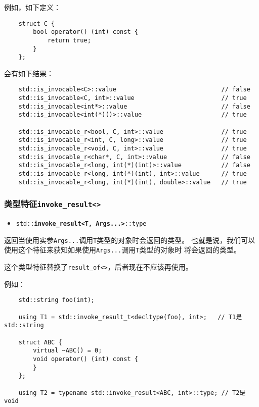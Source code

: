 例如，如下定义：
\begin{lstlisting}
    struct C {
        bool operator() (int) const {
            return true;
        }
    };
\end{lstlisting}
会有如下结果：
\begin{lstlisting}
    std::is_invocable<C>::value                             // false
    std::is_invocable<C, int>::value                        // true
    std::is_invocable<int*>::value                          // false
    std::is_invocable<int(*)()>::value                      // true

    std::is_invocable_r<bool, C, int>::value                // true
    std::is_invocable_r<int, C, long>::value                // true
    std::is_invocable_r<void, C, int>::value                // true
    std::is_invocable_r<char*, C, int>::value               // false
    std::is_invocable_r<long, int(*)(int)>::value           // false
    std::is_invocable_r<long, int(*)(int), int>::value      // true
    std::is_invocable_r<long, int(*)(int), double>::value   // true
\end{lstlisting}

\subsubsection{类型特征\texttt{invoke\_result<>}}
\begin{itemize}
    \item[] \texttt{std::\textbf{invoke\_result<T, Args...>}::type}
\end{itemize}
返回当使用实参\texttt{Args...}调用\texttt{T}类型的对象时会返回的类型。
也就是说，我们可以使用这个特征来获知如果使用\texttt{Args...}调用\texttt{T}类型的对象时
将会返回的类型。

这个类型特征替换了\texttt{result\_of<>}，后者现在不应该再使用。

例如：
\begin{lstlisting}
    std::string foo(int);

    using T1 = std::invoke_result_t<decltype(foo), int>;   // T1是std::string

    struct ABC {
        virtual ~ABC() = 0;
        void operator() (int) const {
        }
    };

    using T2 = typename std::invoke_result<ABC, int>::type; // T2是void
\end{lstlisting}

